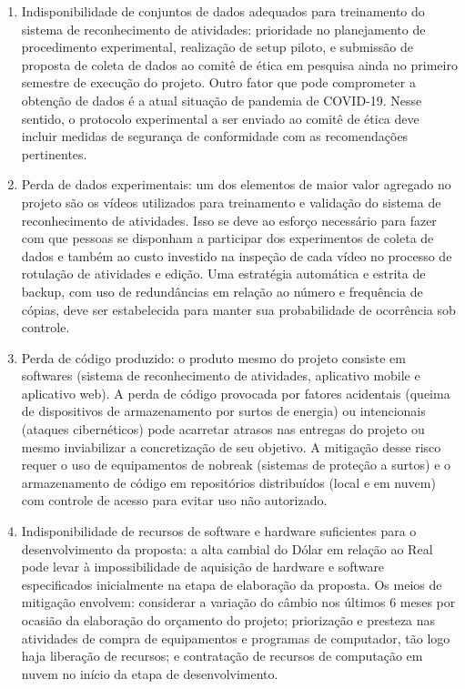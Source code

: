 \begin{enumerate}
	\item Indisponibilidade de conjuntos de dados adequados para treinamento do sistema de reconhecimento de atividades: prioridade no planejamento de procedimento experimental, realização de setup piloto, e submissão de proposta de coleta de dados ao comitê de ética em pesquisa ainda no primeiro semestre de execução do projeto. Outro fator que pode comprometer a obtenção de dados é a atual situação de pandemia de COVID-19. Nesse sentido, o protocolo experimental a ser enviado ao comitê de ética deve incluir medidas de segurança de conformidade com as recomendações pertinentes.
	\item Perda de dados experimentais: um dos elementos de maior valor agregado no projeto são os vídeos utilizados para treinamento e validação do sistema de reconhecimento de atividades. Isso se deve ao esforço necessário para fazer com que pessoas se disponham a participar dos experimentos de coleta de dados e também ao custo investido na inspeção de cada vídeo no processo de rotulação de atividades e edição. Uma estratégia automática e estrita de backup, com uso de redundâncias em relação ao número e frequência de cópias, deve ser estabelecida para manter sua  probabilidade de ocorrência sob controle.
	\item Perda de código produzido: o produto mesmo do projeto consiste em softwares (sistema de reconhecimento de atividades, aplicativo mobile e aplicativo web). A perda de código provocada por fatores acidentais (queima de dispositivos de armazenamento por surtos de energia) ou intencionais (ataques cibernéticos) pode acarretar atrasos nas entregas do projeto ou mesmo inviabilizar a concretização de seu objetivo. A mitigação desse risco requer o uso de equipamentos de nobreak (sistemas de proteção a surtos) e o armazenamento de código em repositórios distribuídos (local e em nuvem) com controle de acesso para evitar uso não autorizado.
	\item Indisponibilidade de recursos de software e hardware suficientes para o desenvolvimento da proposta: a alta cambial do Dólar em relação ao Real pode levar à impossibilidade de aquisição de hardware e software especificados inicialmente na etapa de elaboração da proposta. Os meios de mitigação envolvem: considerar a variação do câmbio nos últimos 6 meses por ocasião da elaboração do orçamento do projeto; priorização e presteza nas atividades de compra de equipamentos e programas de computador, tão logo haja liberação de recursos; e contratação de recursos de computação em nuvem no início da etapa de desenvolvimento.

\end{enumerate}
